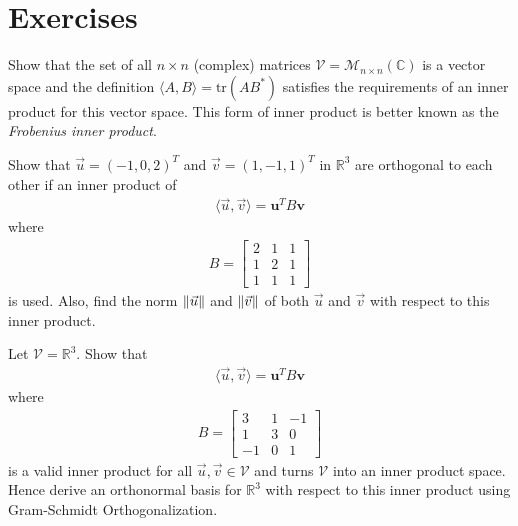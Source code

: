 \section{Exercises}

\begin{Exercise}
Show that the set of all $n \times n$ (complex) matrices $\mathcal{V} = \mathcal{M}_{n \times n}(\mathbb{C})$ is a vector space and the definition $\langle A, B\rangle = \text{tr}(AB^*)$ satisfies the requirements of an inner product for this vector space. This form of inner product is better known as the \textit{Frobenius inner product}.
\end{Exercise}

\begin{Exercise}
Show that $\vec{u} = (-1,0,2)^T$ and $\vec{v} = (1,-1,1)^T$ in $\mathbb{R}^3$ are orthogonal to each other if an inner product of
\begin{align*}
\langle\vec{u}, \vec{v}\rangle = \textbf{u}^TB\textbf{v}
\end{align*}
where 
\begin{align*}
B = 
\begin{bmatrix}
2 & 1 & 1 \\
1 & 2 & 1 \\
1 & 1 & 1
\end{bmatrix}
\end{align*}
is used. Also, find the norm $\norm{\vec{u}}$ and $\norm{\vec{v}}$ of both $\vec{u}$ and $\vec{v}$ with respect to this inner product.
\end{Exercise}

\begin{Exercise}
Let $\mathcal{V} = \mathbb{R}^3$. Show that
\begin{align*}
\langle\vec{u}, \vec{v}\rangle = \textbf{u}^TB\textbf{v}
\end{align*}
where 
\begin{align*}
B = 
\begin{bmatrix}
3 & 1 & -1 \\ 
1 & 3 & 0 \\ 
-1 & 0 & 1
\end{bmatrix}
\end{align*}
is a valid inner product for all $\vec{u}, \vec{v} \in \mathcal{V}$ and turns $\mathcal{V}$ into an inner product space. Hence derive an orthonormal basis for $\mathbb{R}^3$ with respect to this inner product using Gram-Schmidt Orthogonalization. 
\end{Exercise}

